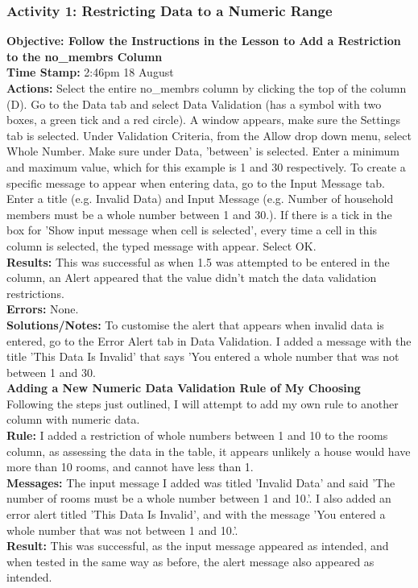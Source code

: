 \documentclass{article}
\begin{document}
\begin{FlushLeft}
\subsubsection*{Activity 1: Restricting Data to a Numeric Range}
\textbf{Objective: Follow the Instructions in the Lesson to Add a Restriction to the no\_membrs Column}\\
\textbf{Time Stamp:} 2:46pm 18 August\\
\textbf{Actions:} Select the entire no\_membrs column by clicking the top of the column (D). Go to the Data tab and select Data Validation (has a symbol with two boxes, a green tick and a red circle). A window appears, make sure the Settings tab is selected. Under Validation Criteria, from the Allow drop down menu, select Whole Number. Make sure under Data, 'between' is selected. Enter a minimum and maximum value, which for this example is 1 and 30 respectively. To create a specific message to appear when entering data, go to the Input Message tab. Enter a title (e.g. Invalid Data) and Input Message (e.g. Number of household members must be a whole number between 1 and 30.). If there is a tick in the box for 'Show input message when cell is selected', every time a cell in this column is selected, the typed message with appear. Select OK.\\
\textbf{Results:} This was successful as when 1.5 was attempted to be entered in the column, an Alert appeared that the value didn't match the data validation restrictions.\\
\textbf{Errors:} None. \\
\textbf{Solutions/Notes:} To customise the alert that appears when invalid data is entered, go to the Error Alert tab in Data Validation. I added a message with the title 'This Data Is Invalid' that says 'You entered a whole number that was not between 1 and 30.\\
\vspace{5mm}
\textbf{Adding a New Numeric Data Validation Rule of My Choosing}\\
Following the steps just outlined, I will attempt to add my own rule to another column with numeric data.\\
\textbf{Rule:} I added a restriction of whole numbers between 1 and 10 to the rooms column, as assessing the data in the table, it appears unlikely a house would have more than 10 rooms, and cannot have less than 1.\\
\textbf{Messages:} The input message I added was titled 'Invalid Data' and said 'The number of rooms must be a whole number between 1 and 10.'. I also added an error alert titled 'This Data Is Invalid', and with the message 'You entered a whole number that was not between 1 and 10.'.\\
\textbf{Result:} This was successful, as the input message appeared as intended, and when tested in the same way as before, the alert message also appeared as intended.


\end{FlushLeft}
\end{document}
